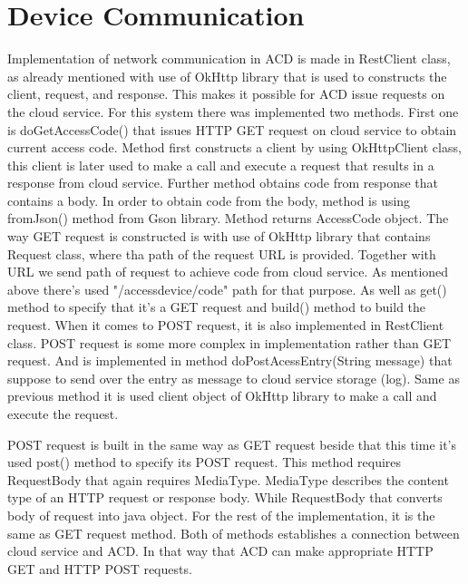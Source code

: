 \section{Device Communication}
\label{sec:device_communication}

Implementation of network communication in ACD is made in RestClient class, as already mentioned with use of OkHttp library that is used to constructs the client, request, and response. This makes it possible for ACD issue requests on the cloud service. For this system there was implemented two methods. First one is doGetAccessCode() that issues HTTP GET request on cloud service to obtain current access code. Method first constructs a client by using OkHttpClient class, this client is later used to make a call and execute a request that results in a response from cloud service. Further method obtains code from response that contains a body. In order to obtain code from the body, method is using fromJson() method from Gson library. Method returns AccessCode object. 
\newline
The way GET request is constructed is with use of OkHttp library that contains Request class, where tha path of the request URL is provided. Together with URL we send path of request to achieve code from cloud service. As mentioned above there’s used "/accessdevice/code" path for that purpose. As well as get() method to specify that it’s a GET request and build() method to build the request. 
\newline\newline
When it comes to POST request, it is also implemented in RestClient class. POST request is some more complex in implementation rather than GET request. And is implemented in method doPostAcessEntry(String message) that suppose to send over the entry as message to cloud service storage (log). Same as previous method it is used client object of OkHttp library to make a call and execute the request. 

POST request is built in the same way as GET request beside that this time it’s used post() method to specify its POST request. This method requires RequestBody that again requires MediaType. MediaType describes the content type of an HTTP request or response body. While RequestBody that converts body of request into java object. For the rest of the implementation, it is the same as GET request method. Both of methods establishes a connection between cloud service and ACD. In that way that ACD can make appropriate HTTP GET and HTTP POST requests. 

